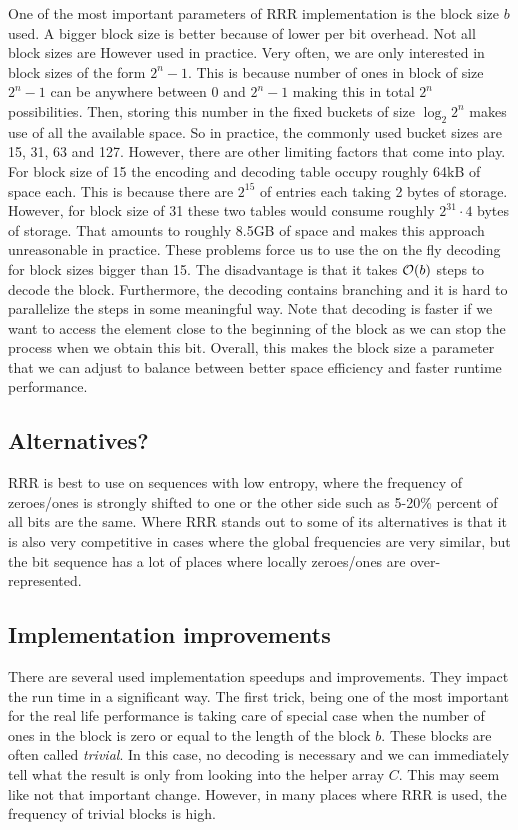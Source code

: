 One of the most important parameters of RRR implementation is the block
size $b$ used. A bigger block size is better because of lower per bit overhead. Not
all block sizes are However used in practice. Very often, we are only interested in
block sizes of the form $2^n-1$. This is because number of ones in block of size $2^n-1$
can be anywhere between 0 and $2^n-1$ making this in total $2^n$ possibilities. Then, storing
this number in the fixed buckets of size $\log_2 2^n$ makes use of all the available space.
So in practice, the commonly used bucket sizes are 15, 31, 63 and 127. However, there are
other limiting factors that come into play. For block size of 15 the encoding and decoding table
occupy roughly 64kB of space each. This is because there are $2^{15}$ of entries each taking
2 bytes of storage. However, for block size of 31 these two tables would consume roughly
$2^{31}\cdot 4$ bytes of storage. That amounts to roughly 8.5GB of space and makes this approach
unreasonable in practice. These problems force us to use the on the fly decoding for block sizes
bigger than 15. The disadvantage is that it takes $\mathcal{O}(b)$ steps to decode the block. Furthermore,
the decoding contains branching and it is hard to parallelize the steps in some meaningful way.
Note that decoding is faster if we want to access the element close to the beginning of
the block as we can stop the process when we obtain this bit. Overall, this makes the block
size a parameter that we can adjust to balance between better space efficiency and faster
runtime performance.


\subsection{Alternatives?}

RRR is best to use on sequences with low entropy, where the frequency of zeroes/ones is
strongly shifted to one or the other side such as 5-20\% percent of all bits are the same.
Where RRR stands out to some of its alternatives is that it is also very competitive in
cases where the global frequencies are very similar, but the bit sequence has a lot of places
where locally zeroes/ones are over-represented.

\subsection{Implementation improvements}

There are several used implementation speedups and improvements. They impact the run time in a
significant way. The first trick, being one of the most important for the real
life performance is taking care of special case when the number of ones in the block is zero
or equal to the length of the block $b$. These blocks are often called \textit{trivial}. In this
case, no decoding is necessary and we can immediately tell what the result is only from looking
into the helper array $C$. This may seem like not that important change. However, in many places
where RRR is used, the frequency of trivial blocks is high.

